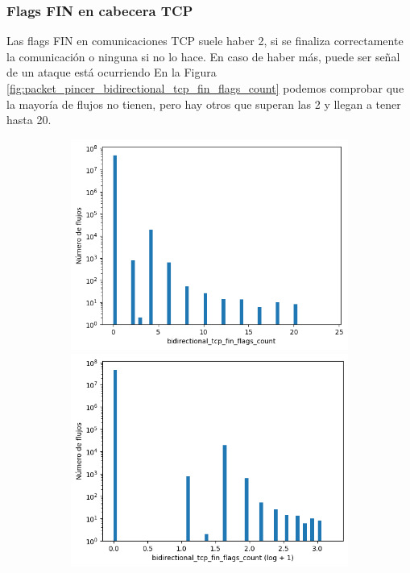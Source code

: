 \subsubsection{Flags FIN en cabecera TCP}

Las flags FIN en comunicaciones TCP suele haber 2, si se finaliza correctamente la comunicación o ninguna si no lo hace. En caso de haber más, puede ser señal de un ataque está ocurriendo En la Figura \ref{fig:packet_pincer_bidirectional_tcp_fin_flags_count} podemos comprobar que la mayoría de flujos no tienen, pero hay otros que superan las 2 y llegan a tener hasta 20.

\begin{figure}[H]
    \centering
    \begin{subfigure}[b]{0.32\textwidth}
        \centering
        \includegraphics[width=\textwidth]{media/packet_pincer_cicddos/bidirectional_tcp_fin_flags_count_linear_x_log_y.png}
        \includegraphics[width=\textwidth]{media/packet_pincer_cicddos/bidirectional_tcp_fin_flags_count_log_x_log_y.png}

\end{subfigure}
\end{figure}

